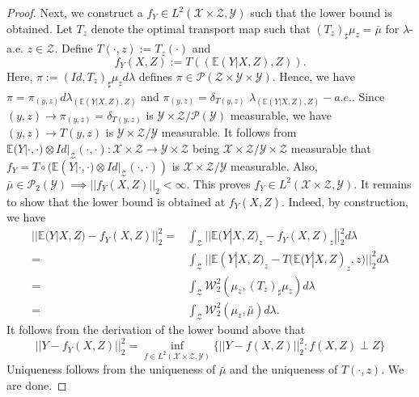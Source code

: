 \documentclass[twoside,11pt]{article}
\begin{document}
\begin{proof}
Next, we construct a $f_Y \in L^2(\mathcal{X} \times \mathcal{Z},\mathcal{Y})$ such that the lower bound is obtained. Let $T_z$ denote the optimal transport map such that $(T_z)_{\sharp}\mu_z = \bar{\mu}$ for $\lambda$-a.e. $z \in \mathcal{Z}$. Define $T(\cdot,z) := T_z(\cdot)$ and
\begin{equation}
f_Y(X,Z) := T((\mathbb{E}(Y|X,Z),Z)).
\end{equation}
Here, $\pi := (Id,T_z)_{\sharp}\mu_zd\lambda$ defines $\pi \in \mathcal{P}(\mathcal{Z} \times \mathcal{Y} \times \mathcal{Y})$. Hence, we have $\pi = \pi_{(y,z)}d\lambda_{(\mathbb{E}(Y|X,Z),Z)}$ and $\pi_{(y,z)} = \delta_{T(y,z)}$ $\lambda_{(\mathbb{E}(Y|X,Z),Z)}-a.e.$. Since $(y,z) \rightarrow \pi_{(y,z)} = \delta_{T(y,z)}$ is $\mathcal{Y} \times \mathcal{Z}/ \mathcal{P}(\mathcal{Y})$ measurable, we have $(y,z) \rightarrow T(y,z)$ is $\mathcal{Y} \times \mathcal{Z}/ \mathcal{Y}$ measurable. It follows from $\mathbb{E}(Y|\cdot,\cdot) \otimes Id|_{\mathcal{Z}}(\cdot,\cdot): \mathcal{X} \times \mathcal{Z} \rightarrow \mathcal{Y} \times \mathcal{Z}$ being $\mathcal{X} \times \mathcal{Z}/ \mathcal{Y} \times \mathcal{Z}$ measurable that $f_Y = T \circ (\mathbb{E}(Y|\cdot,\cdot) \otimes Id|_{\mathcal{Z}}(\cdot,\cdot))$ is $\mathcal{X} \times \mathcal{Z}/ \mathcal{Y}$ measurable. Also, $\bar{\mu} \in \mathcal{P}_2(\mathcal{Y}) \implies ||f_Y(X,Z)||_2 < \infty$. This proves $f_Y \in L^2(\mathcal{X} \times \mathcal{Z},\mathcal{Y})$. It remains to show that the lower bound is obtained at $f_Y(X,Z)$. Indeed, by construction, we have
\begin{align*}
||\mathbb{E}(Y|X,Z) - f_Y(X,Z)||_2^2
= & \int_{\mathcal{Z}} ||\mathbb{E}(Y|X,Z)_z - f_Y(X,Z)_z||_2^2 d\lambda\\
= & \int_{\mathcal{Z}} ||\mathbb{E}(Y|X,Z)_z - T(\mathbb{E}(Y|X,Z)_z,z)||_2^2 d\lambda \\
= & \int_{\mathcal{Z}} \mathcal{W}_2^2(\mu_z, (T_z)_{\sharp}\mu_z) d\lambda\\
= & \int_{\mathcal{Z}} \mathcal{W}_2^2(\mu_z, \bar{\mu}) d\lambda.
\end{align*}
It follows from the derivation of the lower bound above that
\begin{equation}
||Y - f_Y(X,Z)||_2^2 = \inf_{f \in L^2(\mathcal{X} \times \mathcal{Z},\mathcal{Y})} \{||Y - f(X,Z)||_2^2 : f(X,Z) \perp Z\}
\end{equation}
Uniqueness follows from the uniqueness of $\bar{\mu}$ and the uniqueness of $T(\cdot,z)$. We are done.
\end{proof}
\end{document}
